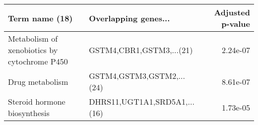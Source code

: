 \begin{tabular}{llr}
\toprule
                              Term name (18) &         Overlapping genes... &  Adjusted p-value \\
\midrule
Metabolism of xenobiotics by cytochrome P450 &     GSTM4,CBR1,GSTM3,...(21) &          2.24e-07 \\
                             Drug metabolism &    GSTM4,GSTM3,GSTM2,...(24) &          8.61e-07 \\
                Steroid hormone biosynthesis & DHRS11,UGT1A1,SRD5A1,...(16) &          1.73e-05 \\
\bottomrule
\end{tabular}
